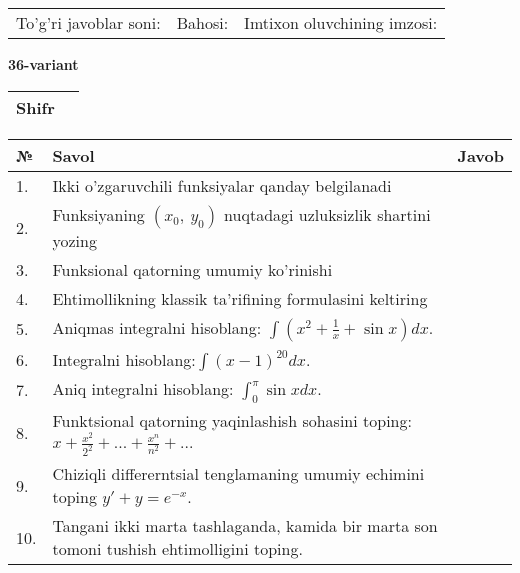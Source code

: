 \documentclass{article}
\begin{document}
  \vspace{1cm}
  
  \begin{tabular}{lll}
  To'g'ri javoblar soni: \underline{\hspace{1.5cm}} & 
  Bahosi: \underline{\hspace{1.5cm}} & 
  Imtixon oluvchining imzosi: \underline{\hspace{2cm}} \\
  \end{tabular}
  
  \egroup
  
  \newpage
  
  
  \textbf{36-variant}\\
  
  \bgroup
  \def\arraystretch{1.6} %
  
  \begin{tabular}{|m{5.7cm}|m{9.5cm}|}
  \hline
  Shifr & \\
  \hline
  \end{tabular}
  
  \vspace{1cm}
  
  \begin{tabular}{|m{0.7cm}|m{10cm}|m{4cm}|}
  \hline
  № & Savol & Javob \\
  \hline
  1. & Ikki o'zgaruvchili funksiyalar qanday belgilanadi &  \\
  \hline
  2. & Funksiyaning \((x_{0},\ y_{0})\) nuqtadagi uzluksizlik shartini yozing &  \\
  \hline
  3. & Funksional qatorning umumiy ko'rinishi &  \\
  \hline
  4. & Ehtimollikning klassik ta'rifining formulasini keltiring &  \\
  \hline
  5. & Aniqmas integralni hisoblang: \(\int {\left( x^{2} + \frac{1}{x} + \sin x \right)dx}\). &  \\
  \hline
  6. & Integralni hisoblang:\(\int {(x - 1)^{20}}dx\). &  \\
  \hline
  7. & Aniq integralni hisoblang: \(\int_{0}^{\pi}{\sin xdx}\). &  \\
  \hline
  8. & Funktsional qatorning yaqinlashish sohasini toping: \(x + \frac{x^{2}}{2^{2}} + ... + \frac{x^{n}}{n^{2}} + ...\) &  \\
  \hline
  9. & Chiziqli differerntsial tenglamaning umumiy echimini toping \(y' + y = e^{- x}\). &  \\
  \hline
  10. & Tangani ikki marta tashlaganda, kamida bir marta son tomoni tushish ehtimolligini toping. &  \\
  \hline
  \end{tabular}
  
\end{document}

